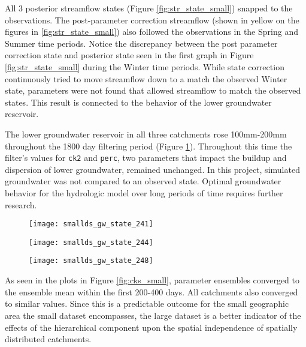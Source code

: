 All 3 posterior streamflow states (Figure \ref{fig:str_state_small}) snapped to the observations. The post-parameter correction streamflow (shown in yellow on the figures in \ref{fig:str_state_small}) also followed the observations in the Spring and Summer time periods. Notice the discrepancy between the post parameter correction state and posterior state seen in the first graph in Figure \ref{fig:str_state_small} during the Winter time periods. While state correction continuously tried to move streamflow down to a match the observed Winter state, parameters were not found that allowed streamflow to match the observed states. This result is connected to the behavior of the lower groundwater reservoir.

The lower groundwater reservoir in all three catchments  rose 100mm-200mm throughout the 1800 day filtering period (Figure \ref{fig:gw_small}). Throughout this time the filter's values for \texttt{ck2} and \texttt{perc}, two parameters that impact the buildup and dispersion of lower groundwater, remained unchanged. In this project, simulated groundwater was not compared to an observed state. Optimal groundwater behavior for the hydrologic model over long periods of time requires further research.

\begin{figure}
\centering
\begin{minipage}{.33\textwidth}
  \centering
  \texttt{[image: smallds\_gw\_state\_241]}
  \label{fig:241gw}
\end{minipage}%
\begin{minipage}{.33\textwidth}
  \centering
  \texttt{[image: smallds\_gw\_state\_244]}
  \label{fig:244gw}
\end{minipage}
\begin{minipage}{.33\textwidth}
  \centering
  \texttt{[image: smallds\_gw\_state\_248]}
  \label{fig:248gw}
\end{minipage}
\label{fig:gw_small}
\end{figure}

As seen in the plots in Figure \ref{fig:cks_small}, parameter ensembles converged to the ensemble mean within the first 200-400 days. All catchments also converged to similar values. Since this is a predictable outcome for the small geographic area the small dataset encompasses, the large dataset is a better indicator of the effects of the hierarchical component upon the spatial independence of spatially distributed catchments.

